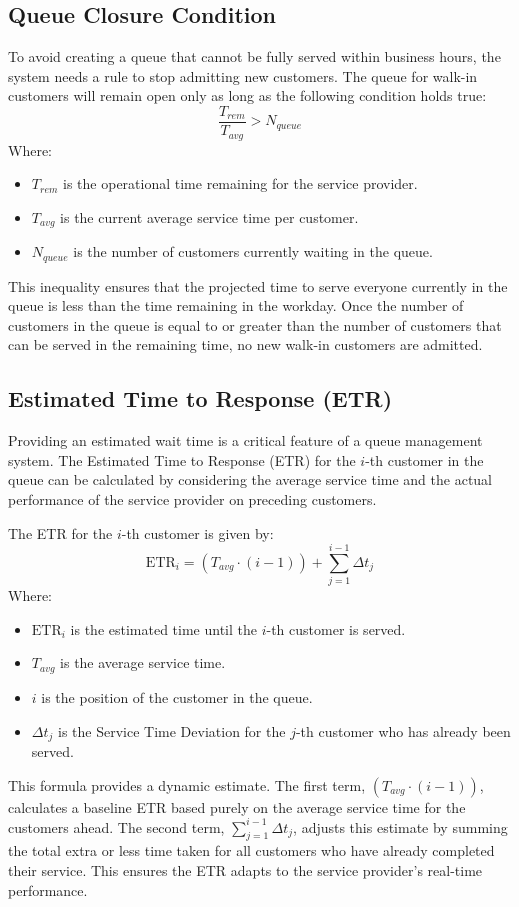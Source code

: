 \documentclass{article}
\begin{document}
\subsection{Queue Closure Condition}
To avoid creating a queue that cannot be fully served within business hours, the system needs a rule to stop admitting new customers. The queue for walk-in customers will remain open only as long as the following condition holds true:
\begin{equation}
    \frac{T_{rem}}{T_{avg}} > N_{queue}
\end{equation}
Where:
\begin{itemize}
    \item $T_{rem}$ is the operational time remaining for the service provider.
    \item $T_{avg}$ is the current average service time per customer.
    \item $N_{queue}$ is the number of customers currently waiting in the queue.
\end{itemize}
This inequality ensures that the projected time to serve everyone currently in the queue is less than the time remaining in the workday. Once the number of customers in the queue is equal to or greater than the number of customers that can be served in the remaining time, no new walk-in customers are admitted.

\subsection{Estimated Time to Response (ETR)}
Providing an estimated wait time is a critical feature of a queue management system. The Estimated Time to Response (ETR) for the $i$-th customer in the queue can be calculated by considering the average service time and the actual performance of the service provider on preceding customers.

The ETR for the $i$-th customer is given by:
\begin{equation}
    \text{ETR}_i = (T_{avg} \cdot (i - 1)) + \sum_{j=1}^{i-1} \Delta t_j
\end{equation}
Where:
\begin{itemize}
    \item $\text{ETR}_i$ is the estimated time until the $i$-th customer is served.
    \item $T_{avg}$ is the average service time.
    \item $i$ is the position of the customer in the queue.
    \item $\Delta t_j$ is the Service Time Deviation for the $j$-th customer who has already been served.
\end{itemize}
This formula provides a dynamic estimate. The first term, $(T_{avg} \cdot (i - 1))$, calculates a baseline ETR based purely on the average service time for the customers ahead. The second term, $\sum_{j=1}^{i-1} \Delta t_j$, adjusts this estimate by summing the total extra or less time taken for all customers who have already completed their service. This ensures the ETR adapts to the service provider's real-time performance.
\end{document}
